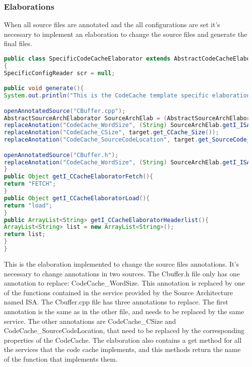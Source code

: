 \subsubsection{Elaborations}
When all source files are annotated and the all configurations are set it's necessary to implement an elaboration to change the source files and generate the final files.
\begin{lstlisting}[caption={Code Cache Elaboration}, label={lst:CCacheElab},language=java]
public class SpecificCodeCacheElaborator extends AbstractCodeCacheElaborator 
{	
SpecificConfigReader scr = null;

public void generate(){
System.out.println("This is the CodeCache template specific elaboration.");

openAnnotatedSource("CBuffer.cpp");		
AbstractSourceArchElaborator SourceArchElab = (AbstractSourceArchElaborator) getElaborator((_SourceArch) target.get_r_ISA());
replaceAnotation("CodeCache_WordSize", (String) SourceArchElab.getI_ISAElaboratorGetWordSize());
replaceAnotation("CodeCache_CSize", target.get_CCache_Size());
replaceAnotation("CodeCache_SourceCodeLocation", target.get_SourceCode_Location());

openAnnotatedSource("CBuffer.h");	
replaceAnotation("CodeCache_WordSize", (String) SourceArchElab.getI_ISAElaboratorGetWordSize());
}	
public Object getI_CCacheElaboratorFetch(){
return "FETCH";
}	
public Object getI_CCacheElaboratorLoad(){
return "load";
}	
public ArrayList<String> getI_CCacheElaboratorHeaderlist(){
ArrayList<String> list = new ArrayList<String>();
return list;
}	
}
\end{lstlisting}
This is the elaboration implemented to change the source files annotations. It's necessary to change annotations in two sources. The Cbuffer.h file only has one annotation to replace: CodeCache\_WordSize. This annotation is replaced by one of the functions contained in the service provided by the Source Architecture named ISA.
The Cbuffer.cpp file has three annotations to replace. The first annotation is the same as in the other file, and needs to be replaced by the same service. The other annotations are CodeCache\_CSize and CodeCache\_SourceCodeLocation, that need to be replaced by the corresponding properties of the CodeCache.
The elaboration also contains a get method for all the services that the code cache implements, and this methods return the name of the function that implements them.

